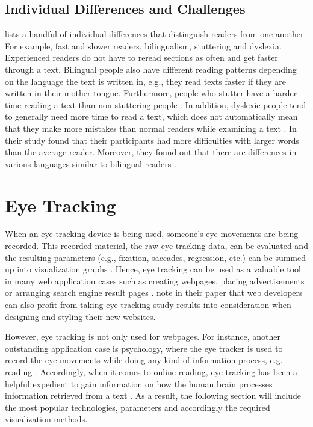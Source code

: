 \subsection{Individual Differences and Challenges}
\label{subsection:Differences}
\textcite{rayner1998eye} lists a handful of individual differences that distinguish readers from one another. For example, fast and slower readers, bilingualism, stuttering and dyslexia. Experienced readers do not have to reread sections as often and get faster through a text. Bilingual people also have different reading patterns depending on the language the text is written in, e.g., they read texts faster if they are written in their mother tongue. Furthermore, people who stutter have a harder time reading a text than non-stuttering people \autocite{rayner1998eye}. 
In addition, dyslexic people tend to generally need more time to read a text, which does not automatically mean that they make more mistakes than normal readers while examining a text \autocite{rayner1998eye, hutzler2004eye}.
In their study \textcite{hutzler2004eye} found that their participants had more difficulties with larger words than the average reader.
Moreover, they found out that there are differences in various languages similar to bilingual readers \autocite{hutzler2004eye, rayner1998eye}.

\section{Eye Tracking}
\label{section:EyeTracking}
When an eye tracking device is being used, someone's eye movements are being recorded. This recorded material, the raw eye tracking data, can be evaluated and the resulting parameters (e.g., fixation, saccades, regression, etc.) can be summed up into visualization graphs \autocite[]{goldberg2003eye, poole2006eye, beymer2007eye}. Hence, eye tracking can be used as a valuable tool in many web application cases such as creating webpages, placing advertisements or arranging search engine result pages \autocite{buscher2009you, liu2015influence}. \textcite[]{buscher2009you} note in their paper that web developers can also profit from taking eye tracking study results into consideration when designing and styling their new websites. 

However, eye tracking is not only used for webpages. For instance, another outstanding application case is psychology, where the eye tracker is used to record the eye movements while doing any kind of information process, e.g. reading \autocite{schiessl2003eye}.
Accordingly, when it comes to online reading, eye tracking has been a helpful expedient to gain information on how the human brain processes information retrieved from a text \autocite[]{schiessl2003eye}.
As a result, the following section will include the most popular technologies, parameters and accordingly the required visualization methods. 

